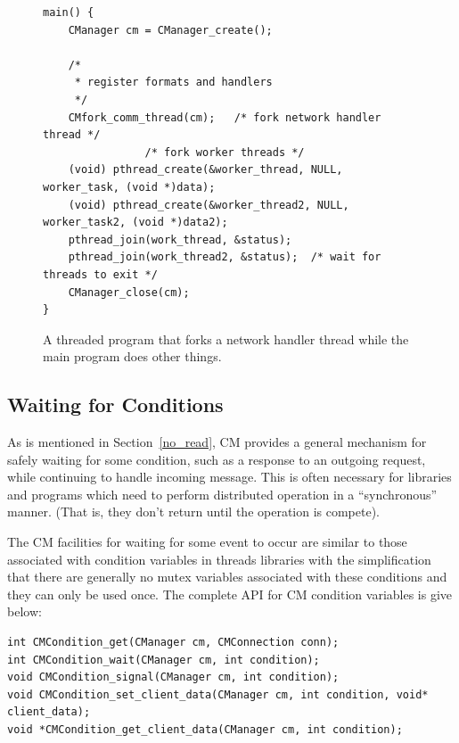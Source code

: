 \documentclass[11pt]{article}
\begin{document}
\begin{figure}
\center\begin{BVerbatim}
main() {
    CManager cm = CManager_create();

    /*
     * register formats and handlers
     */
    CMfork_comm_thread(cm);   /* fork network handler thread */
                /* fork worker threads */
    (void) pthread_create(&worker_thread, NULL, worker_task, (void *)data); 
    (void) pthread_create(&worker_thread2, NULL, worker_task2, (void *)data2); 
    pthread_join(work_thread, &status);
    pthread_join(work_thread2, &status);  /* wait for threads to exit */
    CManager_close(cm);
}
\end{BVerbatim}
\caption{A threaded program that forks a network handler thread while the
main program does other things.\label{fork_example}\label{last_example}} 
\end{figure}

\subsection{Waiting for Conditions\label{sec:conditions}}

As is mentioned in Section~\ref{no_read}, CM provides a general mechanism
for safely waiting for some condition, such as a response to an outgoing
request, while continuing to handle incoming message.  This is often
necessary for libraries and programs which need to perform distributed
operation in a ``synchronous'' manner.  (That is, they don't return until
the operation is compete).

The CM facilities for waiting for some event to occur are similar
to those associated with condition variables in threads libraries with the
simplification that there are generally no mutex variables associated with
these conditions and they can only be used once.  The complete API for
CM condition variables is give below:

\begin{BVerbatim}
int CMCondition_get(CManager cm, CMConnection conn);
int CMCondition_wait(CManager cm, int condition);
void CMCondition_signal(CManager cm, int condition);
void CMCondition_set_client_data(CManager cm, int condition, void* client_data);
void *CMCondition_get_client_data(CManager cm, int condition);
\end{BVerbatim}
\end{document}
